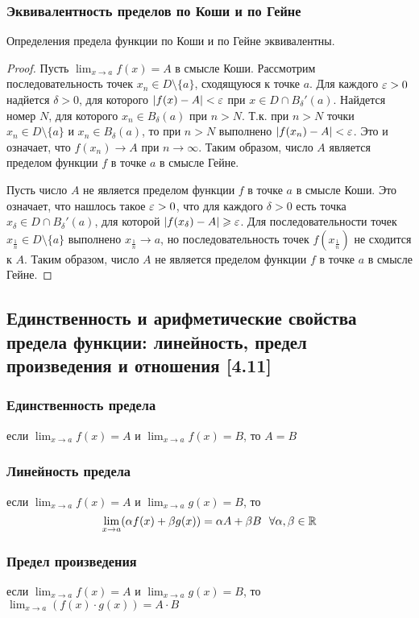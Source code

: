 \documentclass[12pt, a4paper]{article}
\begin{document}
    \subsubsection{Эквивалентность пределов по Коши и по Гейне}
    Определения предела функции по Коши и по Гейне эквивалентны.
    \begin{proof}
    Пусть $\lim_{x \to a} f(x) = A$ в смысле Коши. Рассмотрим последовательность точек $x_n \in D \setminus \{a\}$, сходящуюся к точке $a$. Для каждого $\varepsilon > 0$ надйется $\delta > 0$, для которого $|f(x) - A| < \varepsilon$ при $x \in D \cap B_{\delta}'(a).$ Найдется номер $N$, для которого $x_n \in B_{\delta}(a)$ при $n > N$. Т.к. при $n > N$ точки $x_n \in D \setminus \{a\}$ и $x_n \in B_{\delta}(a)$, то при $n > N$ выполнено $|f(x_n) - A| < \varepsilon$. Это и означает, что $f(x_n) \to A$ при $n \to \infty$. Таким образом, число $A$ является пределом функции $f$ в точке $a$ в смысле Гейне.

    Пусть число $A$ не является пределом функции $f$ в точке $a$ в смысле Коши. Это означает, что нашлось такое $\varepsilon > 0$, что для каждого $\delta > 0$ есть точка $x_{\delta} \in D \cap B_{\delta}'(a)$, для которой $|f(x_{\delta}) - A| \geqslant \varepsilon$. Для последовательности точек $x_{\frac{1}{n}} \in D \setminus \{a\}$ выполнено $x_{\frac{1}{n}} \to a$, но последовательность точек $f(x_{\frac{1}{n}})$ не сходится к $A$. Таким образом, число $A$ не является пределом функции $f$ в точке $a$ в смысле Гейне.
    \end{proof}
    \subsection{Единственность и арифметические свойства предела функции: линейность, предел произведения и отношения [4.11]}
    \subsubsection{Единственность предела}
    если $\lim_{x \to a} f(x) = A$ и $\lim_{x \to a} f(x) = B$, то $A = B$
    \subsubsection{Линейность предела}
    если $\lim_{x \to a} f(x) = A$ и $\lim_{x \to a} g(x) = B$, то 
    \begin{equation*}
        \lim_{x \to a}(\alpha f(x) + \beta g(x)) = \alpha A + \beta B \ \ \forall \alpha, \beta \in \mathbb{R}
    \end{equation*}
    \subsubsection{Предел произведения}
     если $\lim_{x \to a} f(x) = A$ и $\lim_{x \to a} g(x) = B$, то $\lim_{x \to a} (f(x) \cdot g(x)) = A \cdot B$
\end{document}
